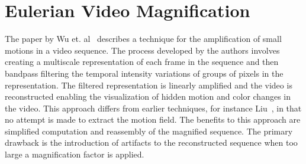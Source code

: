 \documentclass[letterpaper]{article}
\date{\today}
\begin{document}
\maketitle

\section{Eulerian Video Magnification}
The paper by Wu et. al~\cite{eulerian} describes a technique for the
amplification of small motions in a video sequence.  The process
developed by the authors involves creating a multiscale representation
of each frame in the sequence and then bandpass filtering the temporal
intensity variations of groups of pixels in the representation. The
filtered representation is linearly amplified and the video is
reconstructed enabling the visualization of hidden motion and color
changes in the video.  This approach differs from earlier techniques,
for instance Liu~\cite{Liu-lagrange}, in that no attempt is made to
extract the motion field.  The benefits to this approach are
simplified computation and reassembly of the magnified sequence.  The
primary drawback is the introduction of artifacts to the reconstructed
sequence when too large a magnification factor is applied.




\end{document}
